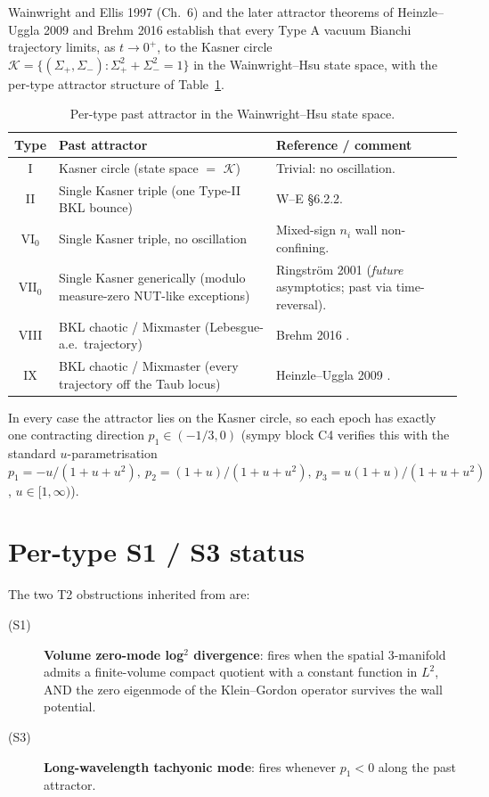 \documentclass[11pt,a4paper]{article}
\theoremstyle{definition}
\begin{document}
Wainwright and Ellis 1997 \cite{WainwrightEllis} (Ch.~6) and the later
attractor theorems of Heinzle--Uggla 2009 \cite{HU2009a,HU2009b} and
Brehm 2016 \cite{Brehm2016} establish that every Type A vacuum Bianchi
trajectory limits, as $t \to 0^+$, to the Kasner circle
$\mathcal{K} = \{(\Sigma_+, \Sigma_-) : \Sigma_+^2 + \Sigma_-^2 = 1\}$
in the Wainwright--Hsu state space, with the per-type attractor structure
of Table~\ref{tab:attractor}.

\begin{table}[ht]
\centering
\begin{tabular}{|c|p{4.5cm}|p{6cm}|}
\hline
Type   & Past attractor  & Reference / comment \\
\hline
I      & Kasner circle (state space $=$ $\mathcal{K}$) & Trivial: no oscillation. \\
II     & Single Kasner triple (one Type-II BKL bounce) & W--E \S6.2.2. \\
VI$_0$ & Single Kasner triple, no oscillation & Mixed-sign $n_i$ wall non-confining. \\
VII$_0$ & Single Kasner generically (modulo measure-zero NUT-like exceptions) & Ringstr\"om 2001 \cite{Ringstrom2001} (\emph{future} asymptotics; past via time-reversal). \\
VIII   & BKL chaotic / Mixmaster (Lebesgue-a.e.\ trajectory) & Brehm 2016 \cite{Brehm2016}. \\
IX     & BKL chaotic / Mixmaster (every trajectory off the Taub locus) & Heinzle--Uggla 2009 \cite{HU2009a}. \\
\hline
\end{tabular}
\caption{Per-type past attractor in the Wainwright--Hsu state space.}
\label{tab:attractor}
\end{table}

In every case the attractor lies on the Kasner circle, so each epoch has
exactly one contracting direction $p_1 \in (-1/3, 0)$ (sympy block C4
verifies this with the standard $u$-parametrisation
$p_1 = -u/(1+u+u^2),\ p_2 = (1+u)/(1+u+u^2),\ p_3 = u(1+u)/(1+u+u^2)$,
$u \in [1, \infty)$).

\section{Per-type S1 / S3 status}

The two T2 obstructions inherited from \cite{T2BI} are:

\begin{description}
  \item[(S1)] \textbf{Volume zero-mode log$^2$ divergence}: fires when the
  spatial 3-manifold admits a finite-volume compact quotient with a constant
  function in $L^2$, AND the zero eigenmode of the Klein--Gordon operator
  survives the wall potential.
  \item[(S3)] \textbf{Long-wavelength tachyonic mode}: fires whenever
  $p_1 < 0$ along the past attractor.
\end{description}
\end{document}
